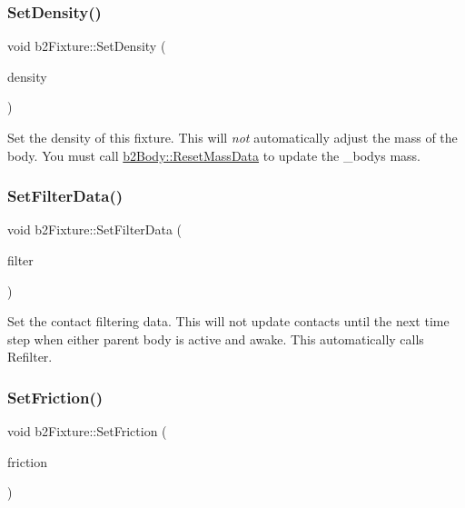 \subsubsection{\texorpdfstring{Set\+Density()}{SetDensity()}}
{\footnotesize\ttfamily void b2\+Fixture\+::\+Set\+Density (\begin{DoxyParamCaption}\item[{float32}]{density }\end{DoxyParamCaption})\hspace{0.3cm}{\ttfamily [inline]}}

Set the density of this fixture. This will {\itshape not} automatically adjust the mass of the body. You must call \mbox{\hyperlink{classb2Body_a109d8567c6ae84c61fce2919fb209c63}{b2\+Body\+::\+Reset\+Mass\+Data}} to update the _body\textquotesingle{}s mass. \mbox{\label{classb2Fixture_a2c5e0d12c174927a4ad550459be334ad}}
\subsubsection{\texorpdfstring{Set\+Filter\+Data()}{SetFilterData()}}
{\footnotesize\ttfamily void b2\+Fixture\+::\+Set\+Filter\+Data (\begin{DoxyParamCaption}\item[{const \mbox{\hyperlink{structb2Filter}{b2\+Filter}} \&}]{filter }\end{DoxyParamCaption})}

Set the contact filtering data. This will not update contacts until the next time step when either parent body is active and awake. This automatically calls Refilter. \mbox{\label{classb2Fixture_ad0cd91eef5858c8ef1d6b62cc2a34ea2}} 
\subsubsection{\texorpdfstring{Set\+Friction()}{SetFriction()}}
{\footnotesize\ttfamily void b2\+Fixture\+::\+Set\+Friction (\begin{DoxyParamCaption}\item[{float32}]{friction }\end{DoxyParamCaption})\hspace{0.3cm}{\ttfamily [inline]}}

